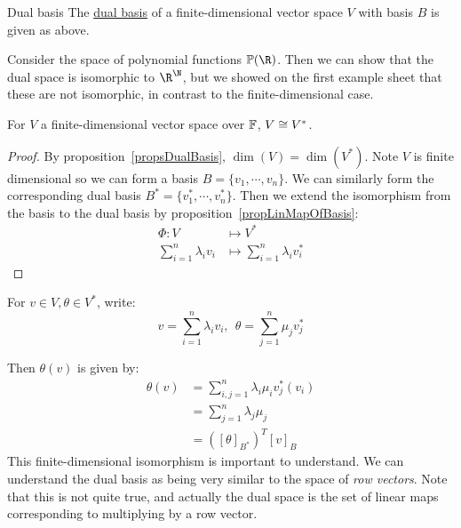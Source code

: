 \documentclass[../Main.tex]{subfiles}
\begin{document}
\begin{definition}{Dual basis}
    The \underline{dual basis} of a finite-dimensional vector space $V$ with basis $B$ is given as above.
\end{definition}
\begin{example}
    Consider the space of polynomial functions $\poly(\R)$. Then we can show that the dual space is isomorphic to $\R^\N$, but we showed on the first example sheet that these are not isomorphic, in contrast to the finite-dimensional case.
\end{example}
\begin{corollary}
    For $V$ a finite-dimensional vector space over $\mathbb{F}$, $V \cong V^*$.
    \label{corDualBasisIsom}
\end{corollary}
\begin{proof}
    By proposition~\ref{propsDualBasis}, $\dim(V) = \dim(V^*)$. Note $V$ is finite dimensional so we can form a basis $B = \{v_1, \cdots, v_n\}$. We can similarly form the corresponding dual basis $B^* = \{v_1^*, \cdots, v_n^*\}$. Then we extend the isomorphism from the basis to the dual basis by proposition~\ref{propLinMapOfBasis}:
    \begin{align*}
        \Phi : V &\mapsto V^*\\
        \sum_{i=1}^{n} \lambda_i v_i &\mapsto \sum_{i = 1}^n \lambda_i v_i^*
    \end{align*}
\end{proof}
For $v \in V, \theta \in V^*$, write:
\begin{equation*}
    v = \sum_{i=1}^{n} \lambda_i v_i, ~~\theta = \sum_{j=1}^{n} \mu_j v_j^*
\end{equation*}

Then $\theta(v)$ is given by:
\begin{align*}
    \theta(v) &= \sum_{i, j = 1}^{n} \lambda_i \mu_i v_{j}^*(v_i) \\
    &= \sum_{j=1}^n \lambda_j \mu_j \\
    &= \left([\theta]_{B^*}\right)^T [v]_B
\end{align*}
This finite-dimensional isomorphism is important to understand. We can understand the dual basis as being very similar to the space of \textit{row vectors}. Note that this is not quite true, and actually the dual space is the set of linear maps corresponding to multiplying by a row vector.
\end{document}
